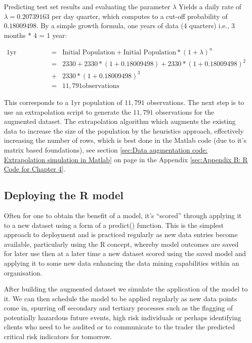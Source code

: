 \documentclass{DissertateUSU}
\begin{document}
\singlespacing

\doublespacing

Predicting test set results and evaluating the parameter \(\lambda\)
Yields a daily rate of \(\lambda = 0.20739163\) per day quarter, which
computes to a cut-off probability of \(0.18009498\). By a simple growth
formula, one years of data (4 quarters) i.e., 3 months * 4 = 1 year:

\singlespacing

\begin{eqnarray}
\mbox{1yr Population} &=& \mbox{Initial Population} + \mbox{Initial Population} * (1 + \lambda)^n \nonumber \\
 &=& 2330 + 2330*(1+0.18009498) + 2330*(1+0.18009498)^2 \nonumber \\
 &+& 2330*(1+0.18009498)^3\nonumber \\
 &=& 11,791 \mbox{observations}
\end{eqnarray} \doublespacing

This corresponds to a 1yr population of \(11,791\) observations. The
next step is to use an extrapolation script to generate the \(11,791\)
observations for the augmented dataset. The extrapolation algorithm
which augments the existing data to increase the size of the population
by the heuristics approach, effectively increasing the number of rows,
which is best done in the Matlab code (due to it's matrix based
foundations), see section
\ref{sec:Data augmentation code: Extrapolation simulation in Matlab} on
page
\pageref{sec:Data augmentation code: Extrapolation simulation in Matlab}in
the Appendix \ref{sec:Appendix B: R Code for Chapter 4}.

\subsection{Deploying the R model}
\label{ssec:Deploying and R model}

Often for one to obtain the benefit of a model, it's ``scored'' through
applying it to a new dataset using a form of a predict() function. This
is the simplest approach to deployment and is practiced regularly as new
data entries become available, particularly using the R concept, whereby
model outcomes are saved for later use then at a later time a new
dataset scored using the saved model and applying it to some new data
enhancing the data mining capabilities within an organisation. \medskip

After building the augmented dataset we simulate the application of the
model to it. We can then schedule the model to be applied regularly as
new data points come in, spurring off secondary and tertiary processes
such as the flagging of potentially hazardous future events, high risk
individuals or perhaps identifying clients who need to be audited or to
communicate to the trader the predicted critical risk indicators for
tomorrow.
\end{document}
